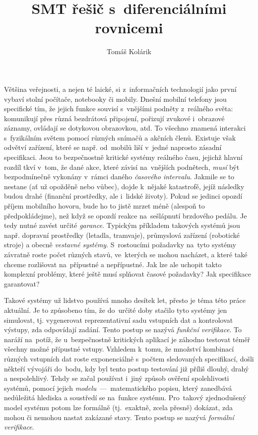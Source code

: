\documentclass[thesis=M,czech]{FITthesis}[2012/06/26]
\title{SMT řešič s~diferenciálními rovnicemi}
\author{Tomáš Kolárik} %
\newcommand{\hl}[1]{\textit{#1}}
\newcommand{\name}[1]{\hl{#1}}
\begin{document}

\begin{introduction}\label{ch:intro}
Většina veřejnosti, a nejen té laické,
si z~informačních technologií
jako první vybaví stolní počítače,
notebooky či mobily.
Dnešní mobilní telefony jsou specifické tím,
že jejich funkce souvisí s~vnějšími podněty z~reálného světa:
komunikují přes různá bezdrátová připojení,
pořizují zvukové i~obrazové záznamy,
ovládají se dotykovou obrazovkou, atd.
To všechno znamená interakci s~fyzikálním světem
pomocí různých snímačů a akčních členů.
Existuje však odvětví zařízení,
které se např. od~mobilů liší v~jedné
naprosto zásadní specifikaci.
Jsou to bezpečnostně kritické systémy reálného času,
jejichž hlavní rozdíl tkví v~tom,
že dané akce, které závisí na~vnějších podnětech,
\hl{musí} být bezpodmínečně vykonány
v~rámci daného \hl{časového intervalu}.
Jakmile se to nestane (ať už opožděně nebo vůbec),
dojde k~nějaké katastrofě,
jejíž následky budou drahé
(finanční prostředky, ale i~lidské životy).
Pokud se jedinci opozdí příjem mobilního hovoru,
bude ho to jistě mrzet méně
(alespoň to předpokládejme),
než když se opozdí reakce na~sešlápnutí brzdového pedálu.
Je tedy nutné zavést určité \hl{garance}.
Typickým příkladem takových systémů
jsou např. dopravní prostředky (letadla, tramvaje),
průmyslová zařízení (robotické stroje)
a obecně \name{vestavné systémy}.
S~rostoucími požadavky na~tyto systémy
závratně roste počet různých stavů,
ve~kterých se mohou nacházet,
a které také chceme rozlišovat
na~přípustné a nepřípustné.
Jak lze ale uchopit takto komplexní problémy,
které ještě musí splňovat časové požadavky?
Jak specifikace garantovat?

Takové systémy už lidstvo používá mnoho desítek let,
přesto je téma této práce aktuální.
Je to způsobeno tím,
že do~určité doby stačilo tyto systémy jen simulovat,
tj. vygenerovat reprezentativní sadu vstupních dat
a kontrolovat výstupy, zda odpovídají zadání.
Tento postup se nazývá \name{funkční verifikace}.
To naráží na~potíž,
že u~bezpečnostně kritických aplikací je záhodno
testovat téměř všechny možné přípustné vstupy.
Vzhledem k~tomu,
že množství kombinací různých vstupních dat
roste exponenciálně s~počtem sledovaných specifikací,
došli někteří vývojáři do~bodu,
kdy byl tento postup testování již příliš
dlouhý, drahý a nespolehlivý.
Tehdy se začal používat i~jiný způsob
ověření spolehlivosti systémů,
pomocí jejich \name{modelu}~---~matematického popisu,
který zanedbává nedůležitá hlediska
a soustředí se na~funkce systému.
Pro~takový zjednodušený model systému
potom lze formálně (tj.~exaktně, zcela přesně) dokázat,
zda mohou či nemohou nastat zakázané stavy.
Tento postup se nazývá \name{formální verifikace}.


\end{introduction}
\end{document}
